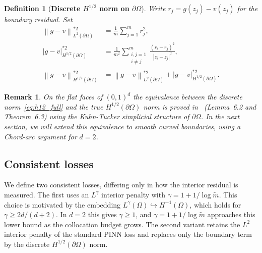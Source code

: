 \documentclass[11pt]{article}
\newtheorem{remark}{Remark}
\newtheorem{definition}{Definition}
\newcommand{\Omg}{\Omega}
\newcommand{\bOmg}{\partial\Omega}
\newcommand{\Honehalf}{H^{1/2}(\partial\Omega)}
\newcommand{\norm}[1]{\left\|#1\right\|}
\newcommand{\seminorm}[1]{\left|#1\right|}
\newcommand{\mtil}{\widetilde{m}}
\begin{document}
\begin{definition}[\textbf{Discrete $H^{1/2}$ norm on $\bOmg$}]
\label{def:h12}
Write $r_j = g(z_j) - v(z_j)$ for the boundary residual. Set
\begin{align}
  \norm{g-v}^{*2}_{L^2(\bOmg)}
  &= \frac{1}{m}\sum_{j=1}^{m} r_j^2,
  \label{eq:h12_l2}\\[4pt]
  \seminorm{g-v}^{*2}_{H^{1/2}(\bOmg)}
  &= \frac{1}{m^2}\sum_{\substack{i,j=1\\i\neq j}}^{m}
    \frac{(r_i - r_j)^2}{|z_i - z_j|^d},
  \label{eq:h12_semi}\\[4pt]
  \norm{g-v}^{*2}_{H^{1/2}(\bOmg)}
  &= \norm{g-v}^{*2}_{L^2(\bOmg)}
  + \seminorm{g-v}^{*2}_{H^{1/2}(\bOmg)}.
  \label{eq:h12_full}
\end{align}
\end{definition}


\begin{remark}\label{rem:equiv}
On the flat faces of $(0,1)^d$ the equivalence between the discrete
norm~\eqref{eq:h12_full} and the true $\Honehalf$ norm is proved
in~\cite{bonito2025} (Lemma~6.2 and Theorem~6.3) using the
Kuhn-Tucker simplicial structure of $\bOmg$. In the next
section,  we will extend this equivalence to smooth
curved boundaries, using a \textit{Chord-arc} argument for $d=2$.
\end{remark}

\subsection{Consistent losses}

We define two consistent losses, differing only in how the interior
residual is measured. The first uses an $L^\gamma$ interior penalty
with $\gamma = 1 + 1/\log\mtil$. This choice is motivated by the
embedding $L^\gamma(\Omg) \hookrightarrow H^{-1}(\Omg)$, which holds
for $\gamma \geq 2d/(d+2)$. In $d=2$ this gives $\gamma \geq 1$, and
$\gamma = 1 + 1/\log\mtil$ approaches this lower bound as the
collocation budget grows. The second variant retains the $L^2$
interior penalty of the standard PINN loss and replaces only the
boundary term by the discrete $\Honehalf$ norm.
\end{document}

